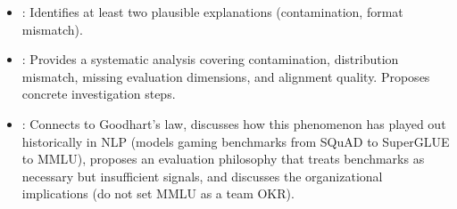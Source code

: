 \begin{interviewq}

\goodgreat
\begin{itemize}
    \item {}: Identifies at least two plausible explanations
          (contamination, format mismatch).
    \item {}: Provides a systematic analysis covering contamination,
          distribution mismatch, missing evaluation dimensions, and alignment
          quality.  Proposes concrete investigation steps.
    \item {}: Connects to Goodhart's law, discusses how this
          phenomenon has played out historically in NLP (models gaming benchmarks
          from SQuAD to SuperGLUE to MMLU), proposes an evaluation philosophy
          that treats benchmarks as necessary but insufficient signals, and
          discusses the organizational implications (do not set MMLU as a team
          OKR).
\end{itemize}

\end{interviewq}

\vspace{0.5em}

